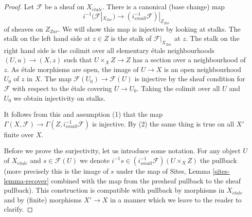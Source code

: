 \documentclass[10pt,a4paper]{amsart}
\theoremstyle{plain}
\theoremstyle{definition}
\theoremstyle{remark}
\numberwithin{equation}{subsection}
\def\etale{{\acute{e}tale}}
\begin{document}
\begin{proof}
Let $\mathcal{F}$ be a sheaf on $X_\etale$. There is a canonical
(base change) map
$$
i^{-1}(\mathcal{F}|_{X_{Zar}})
\longrightarrow
(i_{small}^{-1}\mathcal{F})|_{Z_{Zar}}
$$
of sheaves on $Z_{Zar}$. We will show this map is injective by looking
at stalks. The stalk on the left hand side at $z \in Z$
is the stalk of $\mathcal{F}|_{X_{Zar}}$ at $z$. The stalk on the right
hand side is the colimit over all elementary \'etale neighbourhoods
$(U, u) \to (X, z)$ such that $U \times_X Z \to Z$ has a section over
a neighbourhood of $z$. As \'etale morphisms are open, the image of
$U \to X$ is an open neighbourhood $U_0$ of $z$ in $X$. The map
$\mathcal{F}(U_0) \to \mathcal{F}(U)$ is injective by the sheaf
condition for $\mathcal{F}$ with respect to the \'etale covering $U \to U_0$.
Taking the colimit over all $U$ and $U_0$ we obtain injectivity on stalks.

\medskip\noindent
It follows from this and assumption (1) that the map
$\Gamma(X, \mathcal{F}) \to \Gamma(Z, i^{-1}_{small}\mathcal{F})$
is injective. By (2) the same thing is true on all $X'$ finite over $X$.

\medskip\noindent
Before we prove the surjectivity, let us introduce some notation. For
any object $U$ of $X_\etale$ and $s \in \mathcal{F}(U)$ we
denote $i^{-1}s \in (i_{small}^{-1}\mathcal{F})(U \times_X Z)$
the pullback (more precisely this is the image of $s$ under the map
of Sites, Lemma \ref{sites-lemma-recover} combined with the map from
the presheaf pullback to the sheaf pullback). This construction is
compatible with pullback by morphisms in $X_\etale$ and by (finite)
morphisms $X' \to X$ in a manner which we leave to the reader to clarify.


\end{proof}
\end{document}
